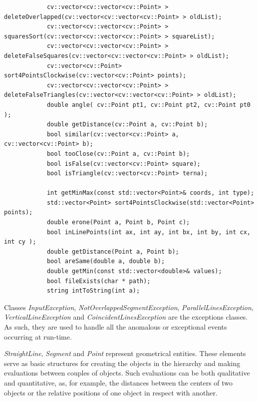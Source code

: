 			\begin{lstlisting}
			cv::vector<cv::vector<cv::Point> > deleteOverlapped(cv::vector<cv::vector<cv::Point> > oldList);
			cv::vector<cv::vector<cv::Point> > squaresSort(cv::vector<cv::vector<cv::Point> > squareList);
			cv::vector<cv::vector<cv::Point> > deleteFalseSquares(cv::vector<cv::vector<cv::Point> > oldList);
			cv::vector<cv::Point> sort4PointsClockwise(cv::vector<cv::Point> points);
			cv::vector<cv::vector<cv::Point> > deleteFalseTriangles(cv::vector<cv::vector<cv::Point> > oldList);
			double angle( cv::Point pt1, cv::Point pt2, cv::Point pt0 );
			double getDistance(cv::Point a, cv::Point b);
			bool similar(cv::vector<cv::Point> a, cv::vector<cv::Point> b);
			bool tooClose(cv::Point a, cv::Point b);
			bool isFalse(cv::vector<cv::Point> square);
			bool isTriangle(cv::vector<cv::Point> terna);	
			
			int getMinMax(const std::vector<Point>& coords, int type);
			std::vector<Point> sort4PointsClockwise(std::vector<Point> points);
			double erone(Point a, Point b, Point c);
			bool inLinePoints(int ax, int ay, int bx, int by, int cx, int cy );
			double getDistance(Point a, Point b);
			bool areSame(double a, double b);
			double getMin(const std::vector<double>& values);
			bool fileExists(char * path);
			string intToString(int a);\end{lstlisting}
		
		Classes \emph{InputException}, \emph{NotOverlappedSegmentException}, \emph{ParallelLinesException}, \emph{VerticalLineException} and \emph{CoincidentLinesException} are the exceptions classes. 
		As such, they are used to handle all the anomalous or exceptional events occurring at run-time.	
	
		\emph{StraightLine}, \emph{Segment} and \emph{Point} represent geometrical entities. These elements serve as basic structures for creating the objects in the hierarchy and making evaluations between couples of objects.
		Such evaluations can be both qualitative and quantitative, as, for example, the distances between the centers of two objects or the relative positions of one object in respect with another.
		
